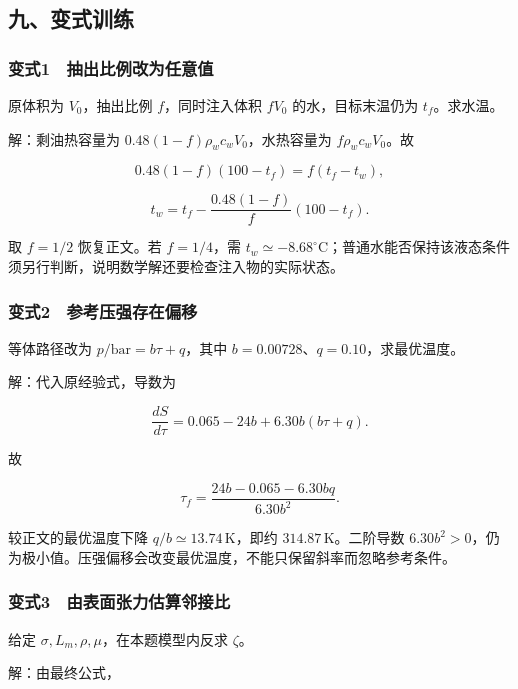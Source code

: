 \documentclass[12pt,a4paper,fontset=fandol]{ctexart}
\begin{document}
\subsection{九、变式训练}\label{ux4e5dux53d8ux5f0fux8badux7ec3-2}

\subsubsection{变式1　抽出比例改为任意值}\label{ux53d8ux5f0f1-ux62bdux51faux6bd4ux4f8bux6539ux4e3aux4efbux610fux503c}

原体积为 \(V_0\)，抽出比例 \(f\)，同时注入体积 \(fV_0\)
的水，目标末温仍为 \(t_f\)。求水温。

解：剩油热容量为 \(0.48(1-f)\rho_wc_wV_0\)，水热容量为
\(f\rho_wc_wV_0\)。故

\[0.48(1-f)(100-t_f)=f(t_f-t_w),\]

\[\boxed{t_w=t_f-\frac{0.48(1-f)}f(100-t_f).}\]

取 \(f=1/2\) 恢复正文。若 \(f=1/4\)，需
\(t_w\simeq-8.68^\circ\mathrm C\)；普通水能否保持该液态条件须另行判断，说明数学解还要检查注入物的实际状态。

\subsubsection{变式2　参考压强存在偏移}\label{ux53d8ux5f0f2-ux53c2ux8003ux538bux5f3aux5b58ux5728ux504fux79fb}

等体路径改为 \(p/\mathrm{bar}=b\tau+q\)，其中
\(b=0.00728\)、\(q=0.10\)，求最优温度。

解：代入原经验式，导数为

\[\frac{dS}{d\tau}=0.065-24b+6.30b(b\tau+q).\]

故

\[\boxed{\tau_f=\frac{24b-0.065-6.30bq}{6.30b^2}.}\]

较正文的最优温度下降 \(q/b\simeq13.74\,\mathrm K\)，即约
\(314.87\,\mathrm K\)。二阶导数
\(6.30b^2>0\)，仍为极小值。压强偏移会改变最优温度，不能只保留斜率而忽略参考条件。

\subsubsection{变式3　由表面张力估算邻接比}\label{ux53d8ux5f0f3-ux7531ux8868ux9762ux5f20ux529bux4f30ux7b97ux90bbux63a5ux6bd4}

给定 \(\sigma,L_m,\rho,\mu\)，在本题模型内反求 \(\zeta\)。

解：由最终公式，
\end{document}
